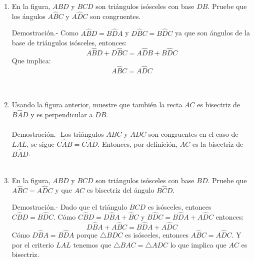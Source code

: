 \documentclass[10pt]{article}
\begin{document}
\begin{enumerate}
	\item En la figura, $ABD$ y $BCD$ son triángulos isósceles con base $DB$. Pruebe que los ángulos $A\widehat{B}C$ y $A\widehat{D}C$ son congruentes.

	\begin{center}
	\end{center}

	Demostración.-\; Como $A\widehat{B}D = B\widehat{D}A$ y $D\widehat{B}C = B\widehat{D}C$ ya que son ángulos de la base de triángulos isósceles, entonces: $$A\widehat{B}D + D\widehat{B}C=A\widehat{D}B + B\widehat{D}C$$ Que implica:
	$$A\widehat{B}C=A\widehat{D}C$$\\\\

	\item Usando la figura anterior, muestre que también la recta $AC$ es bisectriz de $B\widehat{A}D$ y es perpendicular a $DB$. \\\\

	Demostración.-\; Los triángulos $ABC$ y $ADC$ son congruentes en el caso de $LAL$, se sigue $C\widehat{A}B = C\widehat{A}D$. Entonces, por definición, $AC$ es la bisectriz de $B\widehat{A}D$.\\\\

	\item En la figura, $ABD$ y $BCD$ son triángulos isósceles con base $BD$. Pruebe que $A\widehat{B}C=A\widehat{D}C$ y que $AC$ es bisectriz del ángulo $B\widehat{C}D$.

	\begin{center}
	\end{center}

	Demostración.-\; Dado que el triángulo $BCD$ es isósceles, entonces $C\widehat{B}D = B\widehat{D}C$. Cómo $C\widehat{B}D = D\widehat{B}A + \widehat{B}C$ y $B\widehat{D}C = B\widehat{D}A + A\widehat{D}C$ entonces: $$D\widehat{B}A + A\widehat{B}C = B\widehat{D}A + A\widehat{D}C$$ Cómo $D\widehat{B}A = B\widehat{D}A$ porque  $\triangle BDC$ es isósceles, entonces $A\widehat{B}C = A\widehat{D}C$. Y por el criterio $LAL$ tenemos que $\triangle BAC = \triangle ADC$ lo que implica que $AC$ es bisectriz.\\\\


\end{enumerate}
\end{document}

